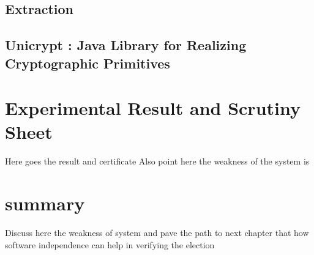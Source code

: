   \subsection{Extraction}
  \subsection{Unicrypt : Java Library for Realizing Cryptographic Primitives}
     
\section{Experimental Result and Scrutiny Sheet} 
  Here goes the result and certificate
  Also point here the weakness of the system is
\section{summary}
  Discuss here the weakness of system and pave the path to next chapter
  that how software independence can help in verifying the election